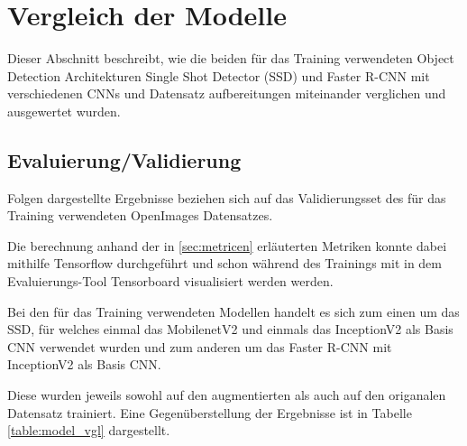 \section{Vergleich der Modelle}\label{sec:model_vergleich}

Dieser Abschnitt beschreibt, wie die beiden für das Training 
verwendeten Object Detection Architekturen Single Shot Detector (SSD)
und Faster R-CNN mit verschiedenen 
CNNs und Datensatz aufbereitungen miteinander verglichen und 
ausgewertet wurden.


\subsection{Evaluierung/Validierung}

Folgen dargestellte Ergebnisse beziehen sich auf 
das Validierungsset des für das Training verwendeten 
OpenImages Datensatzes.

Die berechnung anhand der in \ref{sec:metricen} erläuterten 
Metriken konnte dabei mithilfe Tensorflow durchgeführt 
und schon während des Trainings mit in dem Evaluierungs-Tool 
Tensorboard visualisiert werden werden.

Bei den für das Training verwendeten Modellen handelt es sich zum einen 
um das SSD, für welches einmal das MobilenetV2 und einmals das InceptionV2
als Basis CNN verwendet wurden und zum anderen um das Faster R-CNN mit 
InceptionV2 als Basis CNN.


Diese wurden jeweils sowohl auf den augmentierten als auch auf 
den origanalen Datensatz trainiert. Eine Gegenüberstellung der 
Ergebnisse ist in Tabelle \ref{table:model_vgl} dargestellt.




